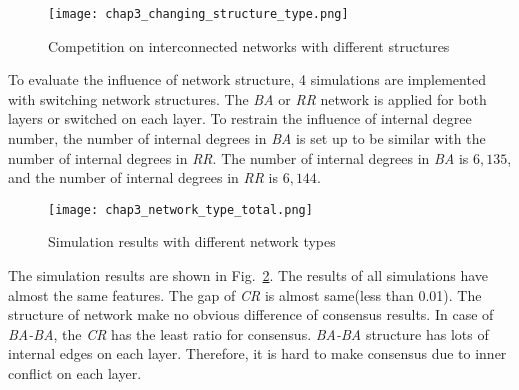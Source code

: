 \begin{figure}[!htb]
	\centering
	\texttt{[image: chap3\_changing\_structure\_type.png]}
	\caption{Competition on interconnected networks with different structures}
	\label{chap3_changing_structure_type}
\end{figure}
To evaluate the influence of network structure, 4 simulations are implemented with switching network structures. The \textit{BA} or \textit{RR} network is applied for both layers or switched on each layer. To restrain the influence of internal degree number, the number of internal degrees in \textit{BA} is set up to be similar with the number of internal degrees in \textit{RR}. The number of internal degrees in \textit{BA} is $6,135$, and the number of internal degrees in \textit{RR} is $6,144$. 

\begin{figure}[!htb]
	\centering
	\texttt{[image: chap3\_network\_type\_total.png]}
	\caption{Simulation results with different network types}
	\label{chap3_network_type_total}
\end{figure}

The simulation results are shown in Fig.~\ref{chap3_network_type_total}. The results of all simulations have almost the same features. The gap of \textit{CR} is almost same(less than 0.01). The structure of network make no obvious difference of consensus results. In case of \textit{BA-BA}, the \textit{CR} has the least ratio for consensus. \textit{BA-BA} structure has lots of internal edges on each layer. Therefore, it is hard to make consensus due to inner conflict on each layer. 


